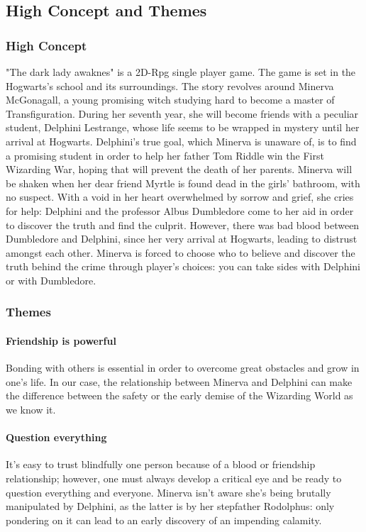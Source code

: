 \subsection{High Concept and Themes}

\subsubsection{High Concept}

"The dark lady awaknes" is a 2D-Rpg single player game. The game is set in the Hogwarts's school and its surroundings. The story revolves around Minerva McGonagall, a young promising witch studying hard to become a master of Transfiguration. During her seventh year, she will become friends with a peculiar student, Delphini Lestrange, whose life seems to be wrapped in mystery until her arrival at Hogwarts. Delphini's true goal, which Minerva is unaware of, is to find a promising student in order to help her father Tom Riddle win the First Wizarding War, hoping that will prevent the death of her parents.
Minerva will be shaken when her dear friend Myrtle is found dead in the girls' bathroom, with no suspect. With a void in her heart overwhelmed by sorrow and grief, she cries for help: Delphini and the professor Albus Dumbledore come to her aid in order to discover the truth and find the culprit. However, there was bad blood between Dumbledore and Delphini, since her very arrival at Hogwarts, leading to distrust amongst each other.
Minerva is forced to choose who to believe and discover the truth behind the crime through player's choices: you can take sides with Delphini or with Dumbledore.

\subsubsection{Themes}

\paragraph{Friendship is powerful}
Bonding with others is essential in order to overcome great obstacles and grow in one's life. In our case, the relationship between Minerva and Delphini can make the difference between the safety or the early demise of the Wizarding World as we know it.

\paragraph{Question everything}
It's easy to trust blindfully one person because of a blood or friendship relationship; however, one must always develop a critical eye and be ready to question everything and everyone. Minerva isn't aware she's being brutally manipulated by Delphini, as the latter is by her stepfather Rodolphus: only pondering on it can lead to an early discovery of an impending calamity.

